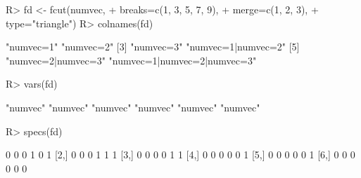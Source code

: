 \begin{Schunk}
% --begin: "fcut.varsspecs"
\begin{Sinput}
R> fd <- fcut(numvec,
+             breaks=c(1, 3, 5, 7, 9),
+             merge=c(1, 2, 3),
+             type="triangle")
R> colnames(fd)
\end{Sinput}
\begin{Soutput}
[1] "numvec=1"                   "numvec=2"                  
[3] "numvec=3"                   "numvec=1|numvec=2"         
[5] "numvec=2|numvec=3"          "numvec=1|numvec=2|numvec=3"
\end{Soutput}
\begin{Sinput}
R> vars(fd)
\end{Sinput}
\begin{Soutput}
[1] "numvec" "numvec" "numvec" "numvec" "numvec" "numvec"
\end{Soutput}
\begin{Sinput}
R> specs(fd)
\end{Sinput}
\begin{Soutput}
     [,1] [,2] [,3] [,4] [,5] [,6]
[1,]    0    0    0    1    0    1
[2,]    0    0    0    1    1    1
[3,]    0    0    0    0    1    1
[4,]    0    0    0    0    0    1
[5,]    0    0    0    0    0    1
[6,]    0    0    0    0    0    0
\end{Soutput}
%
% --end: "fcut.varsspecs"
\end{Schunk}
